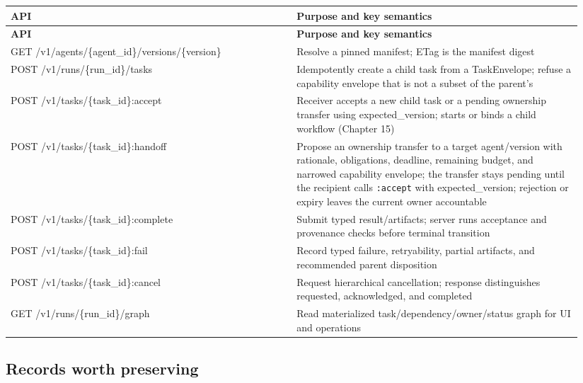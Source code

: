 \BookTableStart
\small
\begin{longtable}{@{}Y{0.4700\linewidth}Y{0.4700\linewidth}@{}}
\color{white}\bfseries \textbf{API} & \color{white}\bfseries \textbf{Purpose and key semantics} \\
\endfirsthead
{}
\color{white}\bfseries \textbf{API} & \color{white}\bfseries \textbf{Purpose and key semantics} \\
\endhead
GET /v1/agents/\{agent\_id\}/versions/\{version\} & Resolve a pinned manifest; ETag is the manifest digest \\
POST /v1/runs/\{run\_id\}/tasks & Idempotently create a child task from a TaskEnvelope; refuse a capability envelope that is not a subset of the parent's \\
POST /v1/tasks/\{task\_id\}:accept & Receiver accepts a new child task or a pending ownership transfer using expected\_version; starts or binds a child workflow (Chapter 15) \\
POST /v1/tasks/\{task\_id\}:handoff & Propose an ownership transfer to a target agent/version with rationale, obligations, deadline, remaining budget, and narrowed capability envelope; the transfer stays pending until the recipient calls \lstinline[style=bookinline]!:accept! with expected\_version; rejection or expiry leaves the current owner accountable \\
POST /v1/tasks/\{task\_id\}:complete & Submit typed result/artifacts; server runs acceptance and provenance checks before terminal transition \\
POST /v1/tasks/\{task\_id\}:fail & Record typed failure, retryability, partial artifacts, and recommended parent disposition \\
POST /v1/tasks/\{task\_id\}:cancel & Request hierarchical cancellation; response distinguishes requested, acknowledged, and completed \\
GET /v1/runs/\{run\_id\}/graph & Read materialized task/dependency/owner/status graph for UI and operations \\
\end{longtable}
\BookTableEnd

\subsection{Records worth preserving}

